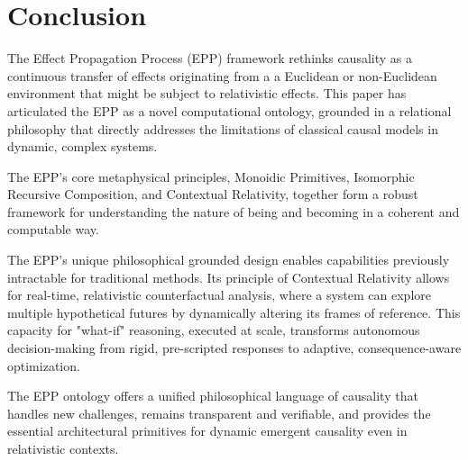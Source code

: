 \section{Conclusion}
\label{sec:conclusion}

The Effect Propagation Process (EPP) framework rethinks causality as a continuous transfer of effects originating from a a Euclidean or non-Euclidean environment that might be subject to relativistic effects. This paper has articulated the EPP as a novel computational ontology, grounded in a relational philosophy that directly addresses the limitations of classical causal models in dynamic, complex systems.

The EPP's core metaphysical principles, Monoidic Primitives, Isomorphic Recursive Composition, and Contextual Relativity, together form a robust framework for understanding the nature of being and becoming in a coherent and computable way. 

The EPP's unique philosophical grounded design enables capabilities previously intractable for traditional methods. Its principle of Contextual Relativity allows for real-time, relativistic counterfactual analysis, where a system can explore multiple hypothetical futures by dynamically altering its frames of reference. This capacity for "what-if" reasoning, executed at scale, transforms autonomous decision-making from rigid, pre-scripted responses to adaptive, consequence-aware optimization. 

The EPP ontology offers a unified philosophical language of causality that handles new challenges, remains transparent and verifiable, and provides the essential architectural primitives for dynamic emergent causality even in relativistic contexts.